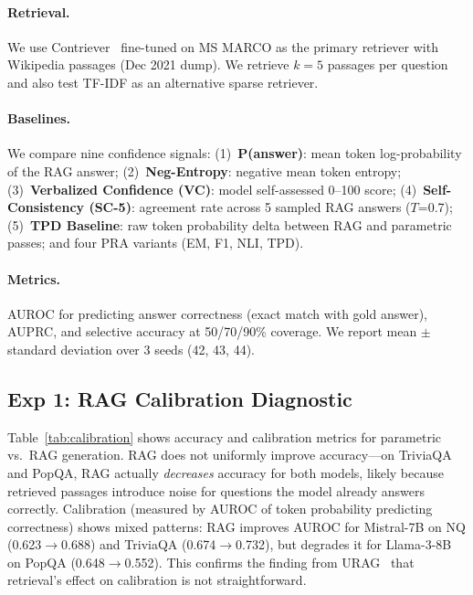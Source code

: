 \documentclass{article}
\begin{document}
\paragraph{Retrieval.} We use Contriever~\citep{izacard2022contriever} fine-tuned on MS MARCO as the primary retriever with Wikipedia passages (Dec 2021 dump). We retrieve $k=5$ passages per question and also test TF-IDF as an alternative sparse retriever.

\paragraph{Baselines.} We compare nine confidence signals: (1)~\textbf{P(answer)}: mean token log-probability of the RAG answer; (2)~\textbf{Neg-Entropy}: negative mean token entropy; (3)~\textbf{Verbalized Confidence (VC)}: model self-assessed 0--100 score; (4)~\textbf{Self-Consistency (SC-5)}: agreement rate across 5 sampled RAG answers ($T$=0.7); (5)~\textbf{TPD Baseline}: raw token probability delta between RAG and parametric passes; and four PRA variants (EM, F1, NLI, TPD).

\paragraph{Metrics.} AUROC for predicting answer correctness (exact match with gold answer), AUPRC, and selective accuracy at 50/70/90\% coverage. We report mean $\pm$ standard deviation over 3 seeds (42, 43, 44).

\subsection{Exp 1: RAG Calibration Diagnostic}

Table~\ref{tab:calibration} shows accuracy and calibration metrics for parametric vs.\ RAG generation. RAG does not uniformly improve accuracy---on TriviaQA and PopQA, RAG actually \emph{decreases} accuracy for both models, likely because retrieved passages introduce noise for questions the model already answers correctly. Calibration (measured by AUROC of token probability predicting correctness) shows mixed patterns: RAG improves AUROC for Mistral-7B on NQ (0.623$\to$0.688) and TriviaQA (0.674$\to$0.732), but degrades it for Llama-3-8B on PopQA (0.648$\to$0.552). This confirms the finding from URAG~\citep{nguyen2026urag} that retrieval's effect on calibration is not straightforward.
\end{document}
